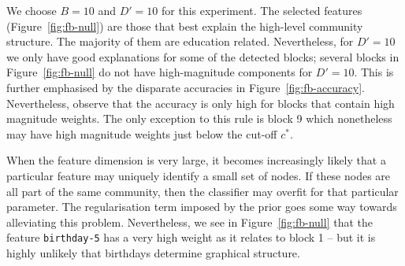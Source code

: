 We choose $B=10$ and $D'=10$ for this experiment. The selected features 
(Figure~\ref{fig:fb-null}) are those that best explain the high-level 
community structure. The majority of them are education related. 
Nevertheless, for $D'=10$ we only have good explanations for some of the detected blocks; several blocks in 
Figure~\ref{fig:fb-null} do not have high-magnitude components for $D'=10$. This is further emphasised by the disparate accuracies in Figure~\ref{fig:fb-accuracy}. Nevertheless, observe that the accuracy is only high for blocks that contain high magnitude weights. The only exception to this rule is block 9 which nonetheless may have high magnitude weights just below the cut-off $c^*$.

When the feature dimension is very large, it becomes increasingly likely that 
a particular feature may uniquely identify a small set of nodes. If these nodes 
are all part of the same community, then the classifier may overfit for that 
particular parameter. The regularisation term imposed by the prior goes some 
way towards alleviating this problem. Nevertheless, we see in 
Figure~\ref{fig:fb-null} that the feature \verb*|birthday-5| has a very 
high weight as it relates to block 1 -- but it is highly unlikely
that birthdays determine graphical structure.